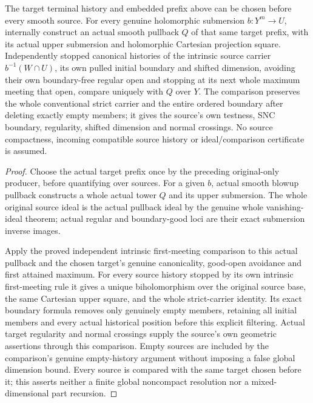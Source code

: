 \begin{theorem}
\label{hir:original-local-pure-boundary-same-target-independent-source}
The target terminal history and embedded prefix above can be chosen
before every smooth source. For every genuine holomorphic submersion
$b:Y^m\to U$, internally construct an actual smooth pullback $Q$ of
that same target prefix, with its actual upper submersion and
holomorphic Cartesian projection square. Independently stopped
canonical histories of the intrinsic source carrier $b^{-1}(W\cap U)$,
its own pulled initial boundary and shifted dimension, avoiding their
own boundary-free regular open and stopping at its next whole
maximum meeting that open, compare uniquely with $Q$ over $Y$.
The comparison preserves the whole conventional strict carrier and
the entire ordered boundary after deleting exactly empty members;
it gives the source's own testness, SNC boundary, regularity,
shifted dimension and normal crossings. No source compactness,
incoming compatible source history or ideal/comparison certificate
is assumed.
\leanok
\end{theorem}
\begin{proof}
Choose the actual target prefix once by the preceding original-only
producer, before quantifying over sources. For a given $b$, actual
smooth blowup pullback constructs a whole actual tower $Q$ and its
upper submersion. The whole original source ideal is the actual
pullback ideal by the genuine whole vanishing-ideal theorem; actual
regular and boundary-good loci are their exact submersion inverse
images.

Apply the proved independent intrinsic first-meeting comparison to
this actual pullback and the chosen target's genuine canonicality,
good-open avoidance and first attained maximum. For every source
history stopped by its own intrinsic first-meeting rule it gives a
unique biholomorphism over the original source base, the same
Cartesian upper square, and the whole strict-carrier identity.
Its exact boundary formula removes only genuinely empty members,
retaining all initial members and every actual historical position
before this explicit filtering. Actual target regularity and normal
crossings supply the source's own geometric assertions through this
comparison. Empty sources are included by the comparison's genuine
empty-history argument without imposing a false global dimension
bound. Every source is compared with the same target chosen before
it; this asserts neither a finite global noncompact resolution nor
a mixed-dimensional part recursion.
\end{proof}
